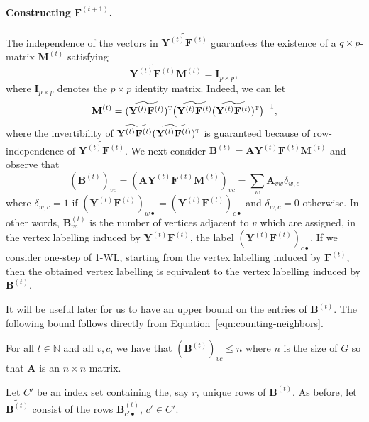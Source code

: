 \paragraph{Constructing $\mathbf{F}^{(t+1)}$.}
The independence of the vectors in $\widetilde{\mathbf{Y}^{(t)}\mathbf{F}^{(t)}}$ guarantees the existence of 
a $q\times p$-matrix $\mathbf{M}^{(t)}$ satisfying
$$
\widetilde{\mathbf{Y}^{(t)}\mathbf{F}^{(t)}}\mathbf{M}^{(t)}=\mathbf{I}_{p\times p},
$$
where $\mathbf{I}_{p\times p}$ denotes the $p\times p$ identity matrix. Indeed, we can let 
$$
\mathbf{M}^{(t)}=(\widetilde{\mathbf{Y}^{(t)}\mathbf{F}^{(t)}})^{\textsc{t}}\bigl(\widetilde{\mathbf{Y}^{(t)}\mathbf{F}^{(t)}}(\widetilde{\mathbf{Y}^{(t)}\mathbf{F}^{(t)}})^{\textsc{t}}\bigr)^{-1},
$$
where the invertibility of $\widetilde{\mathbf{Y}^{(t)}\mathbf{F}^{(t)}}(\widetilde{\mathbf{Y}^{(t)}\mathbf{F}^{(t)}})^{\textsc{t}}$ is guaranteed because of row-independence of $\widetilde{\mathbf{Y}^{(t)}\mathbf{F}^{(t)}}$. We next consider
$\mathbf{B}^{(t)}=\mathbf{A}\mathbf{Y}^{(t)}\mathbf{F}^{(t)}\mathbf{M}^{(t)}$ and observe that
\begin{equation}\label{eqn:counting-neighbors}
(\mathbf{B}^{(t)})_{vc}=(\mathbf{A}\mathbf{Y}^{(t)}\mathbf{F}^{(t)}\mathbf{M}^{(t)})_{vc}=\sum_{w} \mathbf{A}_{vw} \delta_{w,c}
\end{equation}
where $\delta_{w,c}=1$ if $(\mathbf{Y}^{(t)}\mathbf{F}^{(t)})_{w\bullet}=(\mathbf{Y}^{(t)}\mathbf{F}^{(t)})_{c\bullet}$
and $\delta_{w,c}=0$ otherwise. In other words, $\mathbf{B}^{(t)}_{vc}$ is the number of vertices adjacent to $v$ which are assigned, in the vertex labelling induced by 
$ \mathbf{Y}^{(t)}\mathbf{F}^{(t)}$, the label $(\mathbf{Y}^{(t)}\mathbf{F}^{(t)})_{c\bullet}$.
If we consider one-step of 1-WL, starting from the vertex labelling induced by $\mathbf{F}^{(t)}$, then
the obtained vertex labelling is equivalent to the vertex labelling induced by $\mathbf{B}^{(t)}$.

It will be useful later for us to have an upper bound on the entries of $\mathbf{B}^{(t)}$. The following bound follows directly from Equation~\eqref{eqn:counting-neighbors}.
\begin{lemma}\label{lem:bound-B}
    For all $t \in \mathbb{N}$ and all $v,c$, we have that $(\mathbf{B}^{(t)})_{vc} \leq n$ where $n$ is the size of $G$
    so that $\mathbf{A}$ is an $n \times n$ matrix.
\end{lemma}

Let $C'$ be an index set containing the, say $r$, unique rows of $\mathbf{B}^{(t)}$.
As before, let $\widetilde{\mathbf{B}^{(t)}}$ consist of the rows $\mathbf{B}^{(t)}_{c'\bullet}$, $c'\in C'$.

